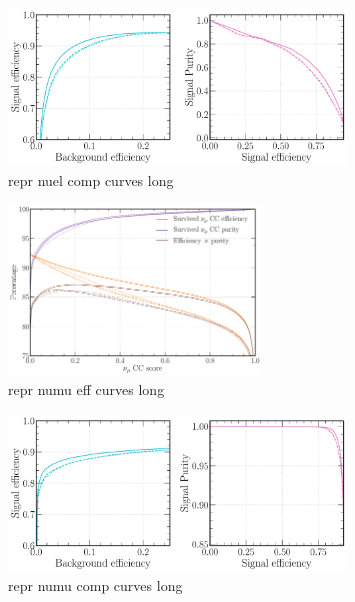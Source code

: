 \begin{figure} %
    \includegraphics[width=0.8\textwidth]{diagrams/7-cvn/chipsnet/repr_nuel_comp_curves.pdf}
    \caption[repr nuel comp curves short]
    {repr nuel comp curves long}
    \label{fig:repr_nuel_comp_curves}
\end{figure}

\begin{figure} %
    \includegraphics[width=0.6\textwidth]{diagrams/7-cvn/chipsnet/repr_numu_eff_curves.pdf}
    \caption[repr numu eff curves short]
    {repr numu eff curves long}
    \label{fig:repr_numu_eff_curves}
\end{figure}

\begin{figure} %
    \includegraphics[width=0.8\textwidth]{diagrams/7-cvn/chipsnet/repr_numu_comp_curves.pdf}
    \caption[repr numu comp curves short]
    {repr numu comp curves long}
    \label{fig:repr_numu_comp_curves}
\end{figure}

